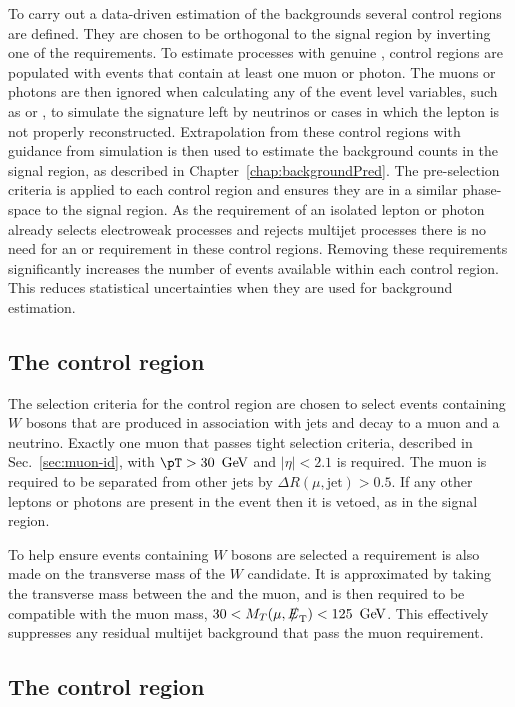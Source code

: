 To carry out a data-driven estimation of the \SM backgrounds several
control regions are defined. They are chosen to be orthogonal to the
signal region by inverting one of the requirements. To estimate
processes with genuine \MET, control regions are populated with events
that contain at least one muon or photon. The muons or photons are then
ignored when calculating any of the event level variables, such as
\alphat or \bdphi, to simulate the signature left by neutrinos or
cases in which the lepton is not properly reconstructed. Extrapolation
from these control regions with guidance from simulation is then used
to estimate the background counts in the signal region, as described
in Chapter~\ref{chap:backgroundPred}. The pre-selection criteria
is applied to each control region and ensures they are in a similar
phase-space to the signal region. As the requirement of an isolated
lepton or photon already selects electroweak processes and rejects
\QCD multijet processes there is no need for an \alphat or \bdphi
requirement in these control regions. Removing these requirements
significantly increases the number of events available within each
control region. This reduces statistical uncertainties when they are
used for background estimation.

\subsection{The \mj control region}

The selection criteria for the \mj control region are chosen to select
events containing $W$ bosons that are produced in association with
jets and decay to a muon and a neutrino. Exactly one muon that passes
tight selection criteria, described in Sec.~\ref{sec:muon-id}, with
$\pT>30~\gev$ and $|\eta|<2.1$ is required. The muon is required to be
separated from other jets by $\Delta R(\mu,\mathrm{jet})>0.5$. If any
other leptons or photons are present in the event then it is vetoed, as
in the signal region.

To help ensure events containing $W$ bosons are selected a requirement
is also made on the transverse mass of the $W$ candidate. It is
approximated by taking the transverse mass between the \MET and the
muon, and is then required to be compatible with the muon mass,
$30<M_T(\mu,\MET)<125~\gev$. This effectively suppresses any residual
\QCD multijet background that pass the muon requirement.

\subsection{The \mmj control region}

